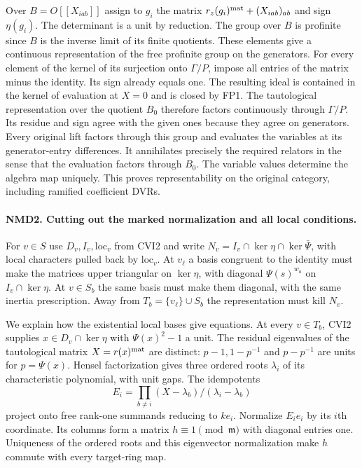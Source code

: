Over $B=O[[X_{iab}]]$ assign to $g_i$ the matrix
$r_z(g_i)^{\rm mat}+(X_{iab})_{ab}$ and sign $\eta(g_i)$.
The determinant is a unit by reduction. The group over $B$ is
profinite since $B$ is the inverse limit of its finite quotients.
These elements give a continuous representation of the free profinite
group on the generators. For every element of the kernel of its
surjection onto $\Gamma/P$, impose all entries of the matrix
minus the identity. Its sign already equals one. The resulting ideal
is contained in the kernel of evaluation at $X=0$ and is closed
by FP1. The tautological representation over the quotient $B_0$
therefore factors continuously through $\Gamma/P$. Its residue and
sign agree with the given ones because they agree on generators.
Every original lift factors through this group and evaluates the
variables at its generator-entry differences. It annihilates precisely
the required relators in the sense that the evaluation factors through
$B_0$. The variable values determine the algebra map uniquely.
This proves representability on the original category, including
ramified coefficient DVRs.

\paragraph{NMD2. Cutting out the marked normalization and all local conditions.}
\label{claim:NMD2}
For $v\in S$ use $D_v,I_v,\mathrm{loc}_v$ from CVI2 and write
$N_v=I_v\cap\ker\eta\cap\ker\bar\Psi$, with local characters
pulled back by $\mathrm{loc}_v$. At $v_\ell$ a basis congruent to
the identity must make the matrices upper triangular on $\ker\eta$,
with diagonal $\Psi(s)^{w_a}$ on $I_v\cap\ker\eta$. At
$v\in S_b$ the same basis must make them diagonal, with the same
inertia prescription. Away from $T_b=\{v_\ell\}\cup S_b$ the
representation must kill $N_v$.

We explain how the existential local bases give equations. At every
$v\in T_b$, CVI2 supplies $x\in D_v\cap\ker\eta$ with
$\Psi(x)^2-1$ a unit. The residual eigenvalues of the tautological
matrix $X=r(x)^{\rm mat}$ are distinct: $p-1,1-p^{-1}$ and
$p-p^{-1}$ are units for $p=\Psi(x)$. Hensel factorization gives
three ordered roots $\lambda_i$ of its characteristic polynomial,
with unit gaps. The idempotents
\[
 E_i=\prod_{b\ne i}(X-\lambda_b)/(\lambda_i-\lambda_b)
\]
project onto free rank-one summands reducing to $k e_i$.
Normalize $E_i e_i$ by its $i$th coordinate. Its columns form a
matrix $h\equiv 1\pmod {\mathfrak m}$ with diagonal entries one.
Uniqueness of the ordered roots and this eigenvector normalization
make $h$ commute with every target-ring map.

